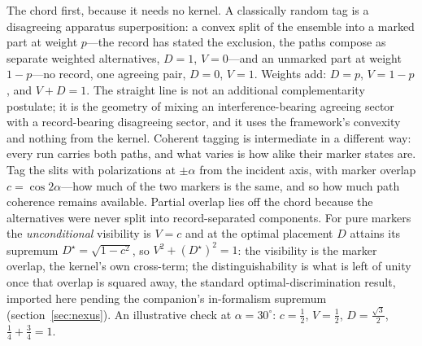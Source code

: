 \documentclass[11pt]{article}
\theoremstyle{definition}
\begin{document}
The chord first, because it needs no kernel. A classically random tag is a disagreeing apparatus superposition: a convex split of the ensemble into a marked part at weight $p$---the record has stated the exclusion, the paths compose as separate weighted alternatives, $D = 1$, $V = 0$---and an unmarked part at weight $1 - p$---no record, one agreeing pair, $D = 0$, $V = 1$. Weights add: $D = p$, $V = 1 - p$, and $V + D = 1$. The straight line is not an additional complementarity postulate; it is the geometry of mixing an interference-bearing agreeing sector with a record-bearing disagreeing sector, and it uses the framework's convexity and nothing from the kernel. Coherent tagging is intermediate in a different way: every run carries both paths, and what varies is how alike their marker states are. Tag the slits with polarizations at $\pm\alpha$ from the incident axis, with marker overlap $c = \cos 2\alpha$---how much of the two markers is the same, and so how much path coherence remains available. Partial overlap lies off the chord because the alternatives were never split into record-separated components. For pure markers the \emph{unconditional} visibility is $V = c$ and at the optimal placement $D$ attains its supremum $D^{\star} = \sqrt{1 - c^2}$, so $V^2 + (D^{\star})^2 = 1$: the visibility is the marker overlap, the kernel's own cross-term; the distinguishability is what is left of unity once that overlap is squared away, the standard optimal-discrimination result, imported here pending the companion's in-formalism supremum (section~\ref{sec:nexus}). An illustrative check at $\alpha = 30^\circ$: $c = \tfrac12$, $V = \tfrac12$, $D = \tfrac{\sqrt3}{2}$, $\tfrac14 + \tfrac34 = 1$.
\end{document}
